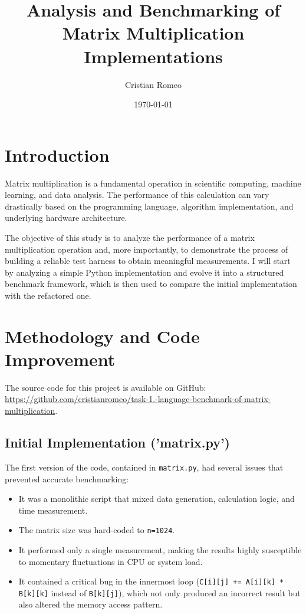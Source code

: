 \documentclass[a4paper]{article}
\title{Analysis and Benchmarking of Matrix Multiplication Implementations}
\author{Cristian Romeo}
\date{\today}
\begin{document}
\maketitle

\section{Introduction}
Matrix multiplication is a fundamental operation in scientific computing, machine learning, and data analysis. The performance of this calculation can vary drastically based on the programming language, algorithm implementation, and underlying hardware architecture.

The objective of this study is to analyze the performance of a matrix multiplication operation and, more importantly, to demonstrate the process of building a reliable test harness to obtain meaningful measurements. I will start by analyzing a simple Python implementation and evolve it into a structured benchmark framework, which is then used to compare the initial implementation with the refactored one.

\section{Methodology and Code Improvement}
The source code for this project is available on GitHub: \url{https://github.com/cristianromeo/task-1.-language-benchmark-of-matrix-multiplication}.

\subsection{Initial Implementation ('matrix.py')}
The first version of the code, contained in \texttt{matrix.py}, had several issues that prevented accurate benchmarking:
\begin{itemize}
    \item It was a monolithic script that mixed data generation, calculation logic, and time measurement.
    \item The matrix size was hard-coded to \texttt{n=1024}.
    \item It performed only a single measurement, making the results highly susceptible to momentary fluctuations in CPU or system load.
    \item It contained a critical bug in the innermost loop (\texttt{C[i][j] += A[i][k] * B[k][k]} instead of \texttt{B[k][j]}), which not only produced an incorrect result but also altered the memory access pattern.
\end{itemize}
\end{document}

